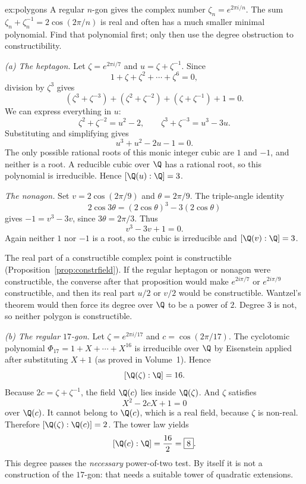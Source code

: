 \begin{solution}{ex:polygons}
\idea A regular $n$-gon gives the complex number $\zeta_n=e^{2\pi i/n}$. The sum $\zeta_n+\zeta_n^{-1}=2\cos(2\pi/n)$ is real and often has a much smaller minimal polynomial. Find that polynomial first; only then use the degree obstruction to constructibility.

\writeup \emph{(a) The heptagon.} Let $\zeta=e^{2\pi i/7}$ and $u=\zeta+\zeta^{-1}$. Since
\[
1+\zeta+\zeta^2+\cdots+\zeta^6=0,
\]
division by $\zeta^3$ gives
\[
(\zeta^3+\zeta^{-3})+(\zeta^2+\zeta^{-2})
+(\zeta+\zeta^{-1})+1=0.
\]
We can express everything in $u$:
\[
\zeta^2+\zeta^{-2}=u^2-2,\qquad
\zeta^3+\zeta^{-3}=u^3-3u.
\]
Substituting and simplifying gives
\[
u^3+u^2-2u-1=0.
\]
The only possible rational roots of this monic integer cubic are $1$ and $-1$, and neither is a root. A reducible cubic over $\Q$ has a rational root, so this polynomial is irreducible. Hence $[\Q(u):\Q]=3$.

\emph{The nonagon.} Set $v=2\cos(2\pi/9)$ and $\theta=2\pi/9$. The triple-angle identity
\[
2\cos3\theta=(2\cos\theta)^3-3(2\cos\theta)
\]
gives $-1=v^3-3v$, since $3\theta=2\pi/3$. Thus
\[
v^3-3v+1=0.
\]
Again neither $1$ nor $-1$ is a root, so the cubic is irreducible and $[\Q(v):\Q]=3$.

The real part of a constructible complex point is constructible (Proposition~\ref{prop:constrfield}). If the regular heptagon or nonagon were constructible, the converse after that proposition would make $e^{2i\pi/7}$ or $e^{2i\pi/9}$ constructible, and then its real part $u/2$ or $v/2$ would be constructible. Wantzel's theorem would then force its degree over $\Q$ to be a power of $2$. Degree $3$ is not, so neither polygon is constructible.

\emph{(b) The regular $17$-gon.} Let $\zeta=e^{2\pi i/17}$ and $c=\cos(2\pi/17)$. The cyclotomic polynomial $\Phi_{17}=1+X+\cdots+X^{16}$ is irreducible over $\Q$ by Eisenstein applied after substituting $X+1$ (as proved in Volume~1). Hence
\[
[\Q(\zeta):\Q]=16.
\]
Because $2c=\zeta+\zeta^{-1}$, the field $\Q(c)$ lies inside $\Q(\zeta)$. And $\zeta$ satisfies
\[
X^2-2cX+1=0
\]
over $\Q(c)$. It cannot belong to $\Q(c)$, which is a real field, because $\zeta$ is non-real. Therefore $[\Q(\zeta):\Q(c)]=2$. The tower law yields
\[
[\Q(c):\Q]=\frac{16}{2}=\boxed{8}.
\]
This degree passes the \emph{necessary} power-of-two test. By itself it is not a construction of the $17$-gon: that needs a suitable tower of quadratic extensions.
\end{solution}

